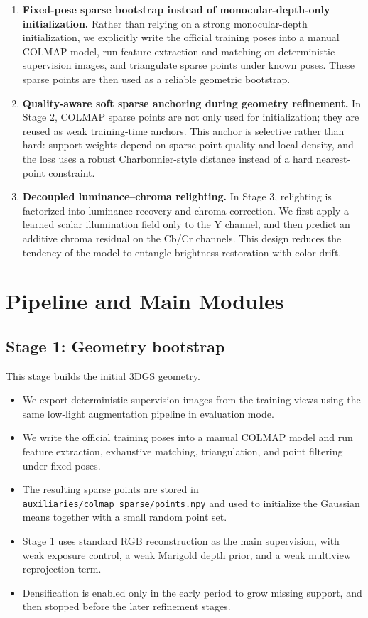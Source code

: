 \documentclass[10pt,a4paper]{article}
\begin{document}
\begin{enumerate}[leftmargin=2em]
  \item \textbf{Fixed-pose sparse bootstrap instead of monocular-depth-only initialization.} Rather than relying on a strong monocular-depth initialization, we explicitly write the official training poses into a manual COLMAP model, run feature extraction and matching on deterministic supervision images, and triangulate sparse points under known poses. These sparse points are then used as a reliable geometric bootstrap.

  \item \textbf{Quality-aware soft sparse anchoring during geometry refinement.} In Stage 2, COLMAP sparse points are not only used for initialization; they are reused as weak training-time anchors. This anchor is selective rather than hard: support weights depend on sparse-point quality and local density, and the loss uses a robust Charbonnier-style distance instead of a hard nearest-point constraint.

  \item \textbf{Decoupled luminance--chroma relighting.} In Stage 3, relighting is factorized into luminance recovery and chroma correction. We first apply a learned scalar illumination field only to the Y channel, and then predict an additive chroma residual on the Cb/Cr channels. This design reduces the tendency of the model to entangle brightness restoration with color drift.
\end{enumerate}

\section{Pipeline and Main Modules}
\subsection{Stage 1: Geometry bootstrap}
This stage builds the initial 3DGS geometry.

\begin{itemize}[leftmargin=2em]
  \item We export deterministic supervision images from the training views using the same low-light augmentation pipeline in evaluation mode.
  \item We write the official training poses into a manual COLMAP model and run feature extraction, exhaustive matching, triangulation, and point filtering under fixed poses.
  \item The resulting sparse points are stored in \texttt{auxiliaries/colmap\_sparse/points.npy} and used to initialize the Gaussian means together with a small random point set.
  \item Stage 1 uses standard RGB reconstruction as the main supervision, with weak exposure control, a weak Marigold depth prior, and a weak multiview reprojection term.
  \item Densification is enabled only in the early period to grow missing support, and then stopped before the later refinement stages.
\end{itemize}
\end{document}
